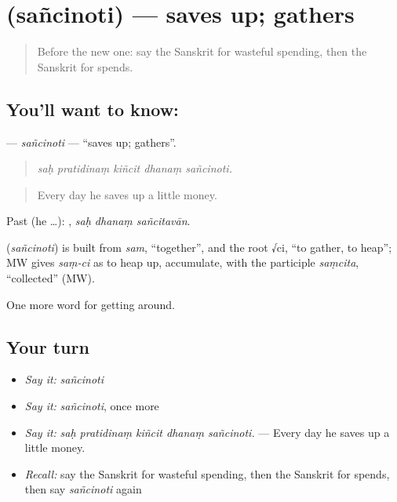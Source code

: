 \section[\texorpdfstring{\sk{सञ्चिनोति} (sañcinoti)}{सञ्चिनोति (sañcinoti)}]{ (sañcinoti) — saves up; gathers}

\label{lesson:SA-C432-sancinoti}



\begin{quote}
Before the new one: say the Sanskrit for wasteful spending, then the Sanskrit for spends.
\end{quote}

\subsection*{You'll want to know: }
\textbf{} — \emph{sañcinoti} — \textquotedblleft{}saves up; gathers\textquotedblright{}.

\begin{quote}
    
\end{quote}

\begin{quote}
\emph{saḥ pratidinaṃ kiñcit dhanaṃ sañcinoti.}
\end{quote}

\begin{quote}
Every day he saves up a little money.
\end{quote}

Past (he …):   , \emph{saḥ dhanaṃ sañcitavān}.

\begin{cousinweb}
\textbf{} (\emph{sañcinoti}) is built from \emph{sam}, \textquotedblleft{}together\textquotedblright{}, and the root √ci, \textquotedblleft{}to gather, to heap\textquotedblright{}; MW gives \emph{saṃ-ci} as to heap up, accumulate, with the participle \emph{saṃcita}, \textquotedblleft{}collected\textquotedblright{} (MW).
\end{cousinweb}

\begin{grammarlens}[title={What you've built}]
One more word for getting around.
\end{grammarlens}

\subsection*{Your turn}
\begin{itemize}
\raggedright
  \item \emph{Say it:} \emph{sañcinoti}
  \item \emph{Say it:} \emph{sañcinoti}, once more
  \item \emph{Say it:} \emph{saḥ pratidinaṃ kiñcit dhanaṃ sañcinoti.} — Every day he saves up a little money.
  \item \emph{Recall:} say the Sanskrit for wasteful spending, then the Sanskrit for spends, then say \emph{sañcinoti} again
\end{itemize}

